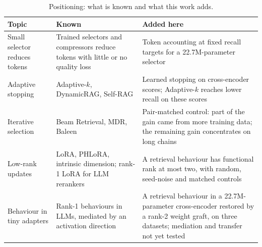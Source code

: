 \begin{table}[htbp]
\centering
\caption{Positioning: what is known and what this work adds.}
\label{tab:positioning}
\small
\begin{tabularx}{\textwidth}{>{\raggedright\arraybackslash}p{3.4cm}X>{\raggedright\arraybackslash}p{4.4cm}}
\toprule
Topic & Known & Added here \\
\midrule
Small selector reduces tokens & Trained selectors and compressors reduce tokens with little or no quality loss \cite{xu2024recomp,chirkova2025provence} & Token accounting at fixed recall targets for a 22.7M-parameter selector \\
Adaptive stopping & Adaptive-$k$, DynamicRAG, Self-RAG \cite{taguchi2025adaptivek,sun2025dynamicrag,asai2024selfrag} & Learned stopping on cross-encoder scores; Adaptive-$k$ reaches lower recall on these scores \\
Iterative selection & Beam Retrieval, MDR, Baleen \cite{zhang2024beamretrieval,xiong2021mdr,khattab2021baleen} & Pair-matched control: part of the gain came from more training data; the remaining gain concentrates on long chains \\
Low-rank updates & LoRA, PHLoRA, intrinsic dimension; rank-1 LoRA for LLM rerankers \cite{hu2022lora,vasani2025phlora,aghajanyan2021intrinsic,nijasure2025howrelevance} & A retrieval behaviour has functional rank at most two, with random, seed-noise and matched controls \\
Behaviour in tiny adapters & Rank-1 behaviours in LLMs, mediated by an activation direction \cite{soligo2025convergent} & A retrieval behaviour in a 22.7M-parameter cross-encoder restored by a rank-2 weight graft, on three datasets; mediation and transfer not yet tested \\
\bottomrule
\end{tabularx}
\end{table}

